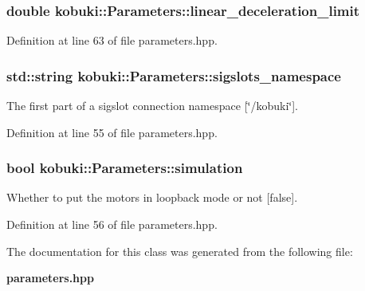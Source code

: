 \subsubsection[{linear\-\_\-deceleration\-\_\-limit}]{\setlength{\rightskip}{0pt plus 5cm}double {\bf kobuki\-::\-Parameters\-::linear\-\_\-deceleration\-\_\-limit}}\label{classkobuki_1_1Parameters_a508680b2d1079e83d80492af73aed9cd}


\-Definition at line 63 of file parameters.\-hpp.

\subsubsection[{sigslots\-\_\-namespace}]{\setlength{\rightskip}{0pt plus 5cm}std\-::string {\bf kobuki\-::\-Parameters\-::sigslots\-\_\-namespace}}\label{classkobuki_1_1Parameters_a0717933338e84bc7907f7e8345e2347e}


\-The first part of a sigslot connection namespace [\char`\"{}/kobuki\char`\"{}]. 



\-Definition at line 55 of file parameters.\-hpp.

\subsubsection[{simulation}]{\setlength{\rightskip}{0pt plus 5cm}bool {\bf kobuki\-::\-Parameters\-::simulation}}\label{classkobuki_1_1Parameters_afb674fc8606ffb15482a4230293cae6c}


\-Whether to put the motors in loopback mode or not [false]. 



\-Definition at line 56 of file parameters.\-hpp.



\-The documentation for this class was generated from the following file\-:\begin{DoxyCompactItemize}
\item 
{\bf parameters.\-hpp}\end{DoxyCompactItemize}
